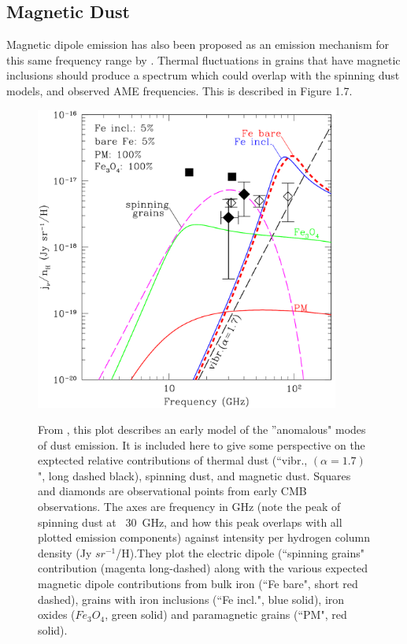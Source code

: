 \subsection{Magnetic Dust}
     Magnetic dipole emission has also been proposed as an emission mechanism for this same frequency range by \cite{draine99}. Thermal fluctuations in grains that have magnetic inclusions should produce a spectrum which could overlap with the spinning dust models, and observed AME frequencies. This is described in Figure 1.7.
\begin{figure}[htb!]
\begin{center}
\label{magneticdust}
\includegraphics[width=100mm]{EPS/draine99_fig7.pdf}
\caption{From \cite{draine99}, this plot describes an early model of the ''anomalous" modes of dust emission. It is included here to give some perspective on the exptected relative contributions of thermal dust (``vibr., $(\alpha = 1.7)$", long dashed black), spinning dust, and magnetic dust. Squares and diamonds are observational points from early CMB observations. The axes are frequency in GHz (note the peak of spinning dust at ~30~GHz, and how this peak overlaps with all plotted emission components) against intensity per hydrogen column density (Jy $sr^{-1}$/H).They plot the electric dipole (``spinning grains" contribution (magenta long-dashed) along with the various expected magnetic dipole contributions from bulk iron (``Fe bare", short red dashed), grains with iron inclusions (``Fe incl.", blue solid), iron oxides ($Fe_{3}O_{4}$, green solid) and paramagnetic grains (``PM", red solid).} 
\end{center}
\end{figure}
